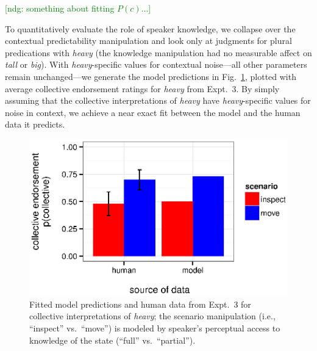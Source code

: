 \documentclass[linguex]{sp}
\newcommand{\ndg}[1]{\textcolor{Green}{[ndg: #1]}}
\begin{document}

\ndg{something about fitting $P(c)$...}

To quantitatively evaluate the role of speaker knowledge, we collapse over the contextual predictability manipulation and look only at judgments for plural predications with \emph{heavy} (the knowledge manipulation had no measurable affect on \emph{tall} or \emph{big}). %
With \emph{heavy}-specific values for contextual noise---all other parameters remain unchanged---we generate the model predictions in Fig.~\ref{heavymodel}, plotted with average collective endorsement ratings for \emph{heavy} from Expt.~3. By simply assuming that the collective interpretations of \emph{heavy} have \emph{heavy}-specific values for noise in context, we achieve a near exact fit between the model and the human data it predicts.

\begin{figure}[h]
	\centering
	\includegraphics[width=.72\linewidth]{plots/heavymodel.eps}
	\caption{Fitted model predictions and human data from Expt.~3 for collective interpretations of \emph{heavy}; the scenario manipulation (i.e., ``inspect'' vs.~``move'') is modeled by speaker's perceptual access to knowledge of the state (``full'' vs.~``partial'').} \label{heavymodel}
\end{figure}
\end{document}
